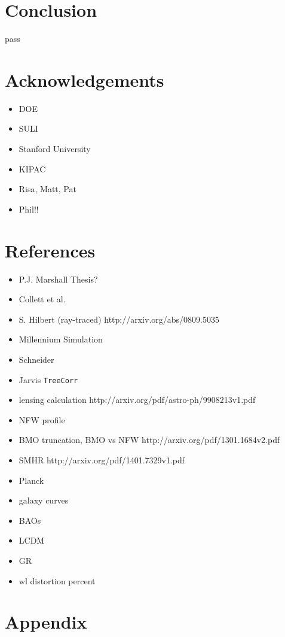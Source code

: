 \documentclass[%
 reprint,
 amsmath,amssymb,
 aps,
]{revtex4-1}
\begin{document}
\section{Conclusion}

pass

\section{Acknowledgements}

\begin{itemize}
\item DOE
\item SULI
\item Stanford University
\item KIPAC
\item Risa, Matt, Pat
\item Phil!!
\end{itemize}

\section{References}

\begin{itemize}
\item P.J. Marshall Thesis?
\item Collett et al.
\item S. Hilbert (ray-traced) http://arxiv.org/abs/0809.5035
\item Millennium Simulation
\item Schneider
\item Jarvis \texttt{TreeCorr}
\item lensing calculation http://arxiv.org/pdf/astro-ph/9908213v1.pdf
\item NFW profile
\item BMO truncation, BMO vs NFW http://arxiv.org/pdf/1301.1684v2.pdf
\item SMHR http://arxiv.org/pdf/1401.7329v1.pdf
\item Planck
\item galaxy curves
\item BAOs
\item LCDM
\item GR
\item wl distortion percent
\end{itemize}

\onecolumngrid
\section{Appendix}
\end{document}

